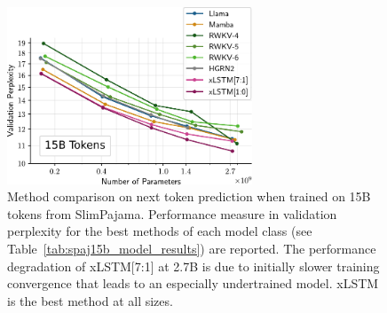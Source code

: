 \documentclass[dvipsnames]{article}
\newcommand{\KP}[1]{\textcolor{blue}{Korbinian: #1}}
\begin{document}
\begin{figure}
   \centering
    \includegraphics[width=0.65\textwidth]{figures/plot_spaj15b_xlstm_scaling_laws_v2b.pdf}
    \vspace{-0.465cm}
    \caption{Method comparison on next token prediction when trained on 15B tokens from SlimPajama. 
    Performance measure in validation perplexity for the best methods of each model class (see Table~\ref{tab:spaj15b_model_results}) are reported.
    The performance degradation of xLSTM[7:1] at 2.7B
    is due to initially slower training convergence that leads to 
    an especially undertrained model.
    xLSTM is the best method at all sizes.
    \label{fig:temp_sclaw15B} } 
\end{figure}
\end{document}

